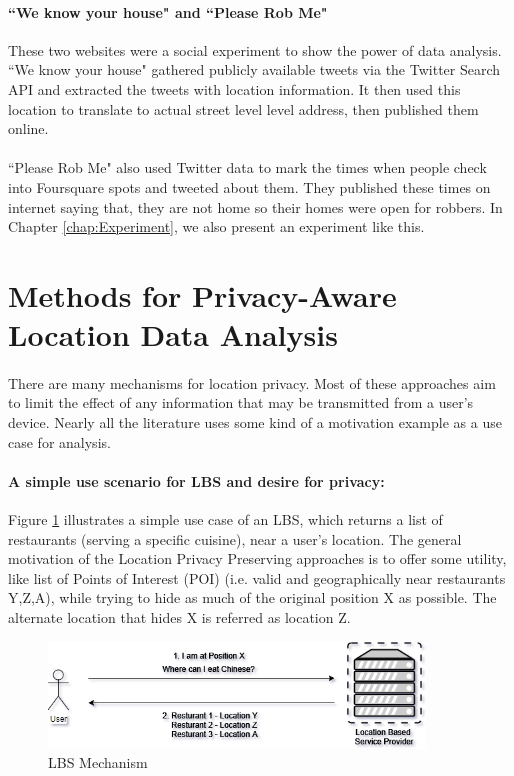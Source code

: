 \documentclass[12pt]{report}
\theoremstyle{named}
\begin{document}
\paragraph{``We know your house"\cite{WeKnowYourHouse} and ``Please Rob Me"\cite{PleaseRobMe}} These two websites were a social experiment to show the power of data analysis. ``We know your house"\cite{WeKnowYourHouse} gathered publicly available tweets via the Twitter Search API\cite{twiterSearchAPI} and extracted the tweets with location information. It then used this location to translate to actual street level level address, then published them online. 
\paragraph{}
``Please Rob Me"\cite{PleaseRobMe} also used Twitter data to mark the times when people check into Foursquare\cite{Foursquare} spots and tweeted about them. They published these times on internet saying that, they are not home so their homes were open for robbers. In Chapter \ref{chap:Experiment}, we also present an experiment like this.

\section{Methods for Privacy-Aware Location Data Analysis}
\label{sec:MethodsForLocationPrivacy}
\paragraph{}
There are many mechanisms for location privacy. Most of these approaches aim to limit the effect of any information that may be transmitted from a user's device. Nearly all the literature uses some kind of a motivation example as a use case for analysis.
\paragraph{A simple use scenario for LBS and desire for privacy:}

Figure \ref{fig:LBSMechanism} illustrates a simple use case of an LBS, which returns a list of restaurants (serving a specific cuisine), near a user's location. The general motivation of the Location Privacy Preserving approaches is to offer some utility, like list of Points of Interest (POI) (i.e. valid and geographically near restaurants Y,Z,A), while trying to hide as much of the original position X as possible. The alternate location that hides X is referred as location Z.
\begin{figure}[ht]
\centering
        \includegraphics[width=100mm,scale=0.5]{Images/LBS-Scenario.png}
    \caption{LBS Mechanism}
    \label{fig:LBSMechanism}
\end{figure}
\end{document}
